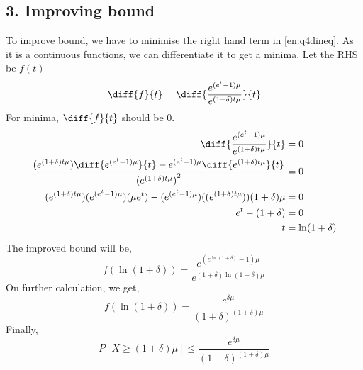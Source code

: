 \begin{solution}
	\section*{3. Improving bound}
	To improve bound, we have to minimise the right hand term in \ref{en:q4dineq}. As it is a continuous functions, we can differentiate it to get a minima. Let the RHS be $f(t)$
	\[\diff{f}{t} = \diff{\frac{e^{(e^t-1)\mu}}{e^{(1+\delta)t\mu}}}{t}\]
	For minima, $\diff{f}{t} $ should be 0.
	\begin{align}
		\diff{\frac{e^{(e^t-1)\mu}}{e^{(1+\delta)t\mu}}}{t} & = 0 \\
		\frac{(e^{(1+\delta)t\mu})\diff{e^{(e^t-1)\mu}}{t}- e^{(e^t-1)\mu}\diff{e^{(1+\delta)t\mu}}{t}}{{(e^{(1+\delta)t\mu})}^2} & = 0 \\
		(e^{(1+\delta)t\mu})(e^{(e^t-1)\mu})(\mu e^t) - (e^{(e^t-1)\mu})((e^{(1+\delta)t\mu}))(1+\delta)\mu & = 0 \\
		e^t - (1+\delta) & = 0 \\
		t & = \ln(1+\delta)
	\end{align}
	The improved bound will be,
	\[f(\ln(1+\delta)) = \frac{e^{(e^{\ln(1+\delta)}-1)\mu}}{e^{(1+\delta){\ln(1+\delta)}\mu}}\]
	On further calculation, we get,
	\[f(\ln(1+\delta)) = \frac{e^{\delta \mu}}{(1+\delta)^{(1+\delta)\mu}}\]
	Finally,
	\[P[X\geq (1+\delta)\mu] \leq \frac{e^{\delta \mu}}{(1+\delta)^{(1+\delta)\mu}}\]
		
\end{solution}
